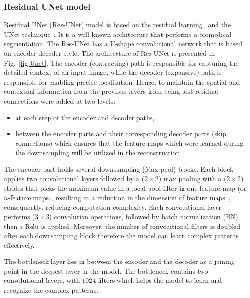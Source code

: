 \subsubsection{Residual UNet model}
Residual UNet (Res-UNet) model is based on the residual learning~\cite{He2016} and the UNet technique~\cite{Ronneberger2015}. 
It is a well-known architecture that performs a biomedical segmentation. 
The Res-UNet has a U-shape convolutional network that is based on encoder-decoder style. 
The architecture of Res-UNet is presented in Fig.~\ref{fig:Unet}.
The encoder (contracting) path is responsible for capturing the detailed context of an input image, while the decoder (expansive) path is responsible for enabling precise localisation. 
Hence, to maintain the spatial and contextual information from the previous layers from being lost residual connections were added at two levels:
\begin{itemize}
	\item at each step of the encoder and decoder paths,
	\item between the encoder parts and their corresponding decoder parts (skip connections) which ensures that the feature maps which were learned during the downsampling will be utilized in the reconstruction. 
\end{itemize}

The encoder part holds several downsampling (Max-pool) blocks. 
Each block applies two convolutional layers followed by a (\(2\times2\)) max pooling with a (\(2\times2\)) strides that picks the maximum value in a local pool filter in one feature map (or \(n\)-feature maps), resulting in a reduction in the dimension of feature maps~\cite{Lecun2015}, consequently, reducing computation complexity.
Each convolutional layer performs (\(3\times3\)) convolution operations, followed by batch normalization (BN) then a Relu is applied.
Moreover, the number of convolutional filters is doubled after each downsampling block therefore the model can learn complex patterns effectively. 

The bottleneck layer lies in between the encoder and the decoder as a joining point in the deepest layer in the model.
The bottleneck contains two convolutional layers, with \(1024\) filters which helps the model to learn and recognize the complex patterns.

